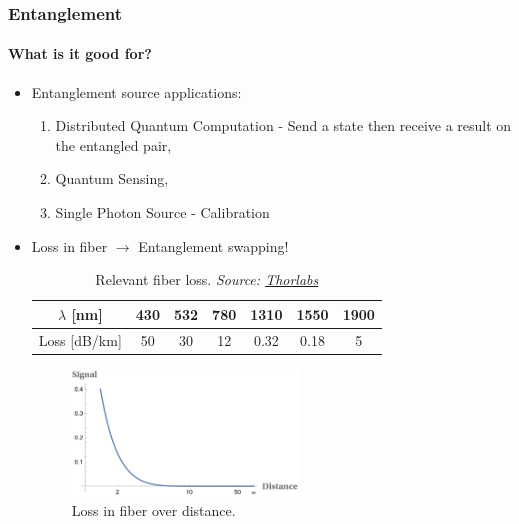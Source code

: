 \documentclass[serif,8pt]{beamer}
\begin{document}
\begin{frame}[t]
	\frametitle{Entanglement}
	\framesubtitle{What is it good for?}
	\begin{itemize}
		\item Entanglement source applications:
			\begin{enumerate}
				\item Distributed Quantum Computation - Send a state then receive a result on the entangled pair,
				\item Quantum Sensing,
				\item Single Photon Source - Calibration
			\end{enumerate}
		\item Loss in fiber $\rightarrow$ Entanglement swapping!
	\begin{table}
		\caption{Relevant fiber loss. \textit{Source: \href{https://www.thorlabs.com/newgrouppage9.cfm?objectgroup_id=949}{Thorlabs}}}
		\label{tab:fiberloss}
		\begin{tabular}{|c|c|c|c|c|c|c|}
			\hline
			$\lambda$ [nm] & 430 & 532 & 780 & 1310 & 1550 & 1900\\
			\hline
			Loss [dB/km] & 50 & 30 & 12 & 0.32 &  0.18 & 5\\
			\hline
		\end{tabular}
	\end{table}
	\begin{figure}
		\begin{center}
			\includegraphics[width=6cm]{FiberLoss.png}
		\end{center}
		\caption{Loss in fiber over distance.}\label{fig:fiberloss}
	\end{figure}
	\end{itemize}
\end{frame}
\end{document}
